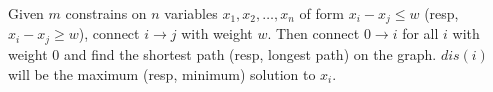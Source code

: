 \normalsize
Given $m$ constrains on $n$ variables $x_1, x_2, \ldots, x_n$ of form $x_i - x_j \leq w$ (resp, $x_i - x_j \geq w$), connect $i \rightarrow j$ with weight $w$. Then connect $0 \rightarrow i$ for all $i$ with weight $0$ and find the shortest path (resp, longest path) on the graph. $dis(i)$ will be the maximum (resp, minimum) solution to $x_i$.
